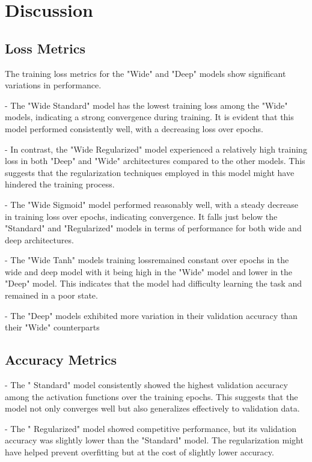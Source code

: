 \documentclass{article}
\begin{document}
\section{Discussion}


\subsection{Loss Metrics}

The training loss metrics for the "Wide" and "Deep" models show significant variations in performance.

- The "Wide Standard" model has the lowest training loss among the "Wide" models, indicating a strong convergence during training. It is evident that this model performed consistently well, with a decreasing loss over epochs.

- In contrast, the "Wide Regularized" model experienced a relatively high training loss in both "Deep" and "Wide" architectures compared to the other models. This suggests that the regularization techniques employed in this model might have hindered the training process.

- The "Wide Sigmoid" model performed reasonably well, with a steady decrease in training loss over epochs, indicating convergence. It falls just below the "Standard" and "Regularized" models in terms of performance for both wide and deep architectures. 

- The "Wide Tanh" models training lossremained constant over epochs in the wide and deep model with it being high in the "Wide" model and lower in the "Deep" model. This indicates that the model had difficulty learning the task and remained in a poor state. 

- The "Deep" models exhibited more variation in their validation accuracy than their "Wide" counterparts

\subsection{Accuracy Metrics}

- The " Standard" model consistently showed the highest validation accuracy among the activation functions over the training epochs. This suggests that the model not only converges well but also generalizes effectively to validation data.

- The " Regularized" model showed competitive performance, but its validation accuracy was slightly lower than the "Standard" model. The regularization might have helped prevent overfitting but at the cost of slightly lower accuracy.
\end{document}
